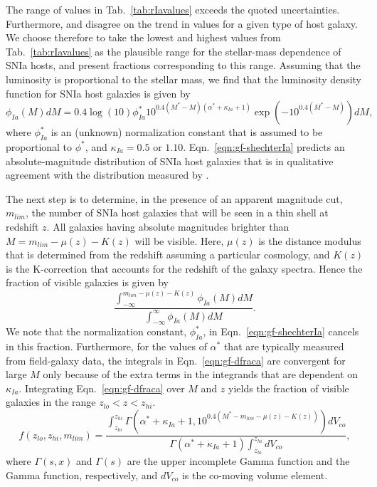 \documentclass[preprint2]{aastex}    %
\begin{document}
The range of values in Tab.~\ref{tab:rIavalues} exceeds the quoted uncertainties. 
Furthermore, \cite{smi11} and \cite{sul06} disagree on the trend in values for a given type of host galaxy.
We choose therefore to take the lowest and highest values from Tab.~\ref{tab:rIavalues} 
as the plausible range for the stellar-mass dependence of SNIa
hosts, and present fractions corresponding to this range.
Assuming that the luminosity is proportional to the stellar mass, we find that
the luminosity density function for SNIa host galaxies is given by
\begin{equation}
  \phi_{Ia}(M)dM=0.4\log(10)\phi_{Ia}^{*}10^{0.4(M^{*}-M)(\alpha^{*}+\kappa_{Ia}+1)}\exp({-10^{0.4(M^{*}-M)}})dM,
\label{eqn:gf-shechterIa}
\end{equation}
where $\phi_{Ia}^{*}$ is an (unknown) normalization constant that is assumed to be proportional to
$\phi^{*}$, and $\kappa_{Ia}=0.5$ or $1.10$. 
Eqn.~\ref{eqn:gf-shechterIa} predicts an absolute-magnitude distribution of SNIa host galaxies
that is in qualitative agreement with the distribution measured by \cite{yas10}.

The next step is to determine, in the presence of an apparent magnitude cut, $m_{lim}$,
the number of SNIa host galaxies that will be seen in a thin shell at redshift $z$.
All galaxies having absolute magnitudes brighter than $M = m_{lim}-\mu(z)-K(z)$ will be visible.
Here, $\mu(z)$ is the distance modulus that is determined from the redshift assuming a particular cosmology, 
and $K(z)$ is the K-correction that accounts for the redshift of the galaxy spectra. 
Hence the fraction of visible galaxies is given by
\begin{equation}
 \frac{ \int^{m_{lim}-\mu(z)-K(z)}_{-\infty} \phi_{Ia}(M)dM} {\int^\infty_{-\infty}\phi_{Ia}(M)dM}.
\label{eqn:gf-dfraca}
\end{equation}
We note that the normalization constant, $\phi_{Ia}^{*}$, in Eqn.~\ref{eqn:gf-shechterIa} cancels in this fraction.
Furthermore, for the values of $\alpha^{*}$ that are 
typically measured from field-galaxy data, the integrals in Eqn.~\ref{eqn:gf-dfraca} are convergent for large $M$ only 
because of the extra terms in the integrands that are dependent on $\kappa_{Ia}$. 
Integrating Eqn.~\ref{eqn:gf-dfraca} over $M$ and $z$ yields the fraction of visible galaxies in the range $z_{lo}<z<z_{hi}$. 
\begin{equation}
   f(z_{lo},z_{hi},m_{lim})= \frac{ \int_{z_{lo}}^{z_{hi}} \Gamma(\alpha^{*}+\kappa_{Ia}+1, 10^{0.4(M^{*}- m_{lim}-\mu(z)-K(z))})dV_{co}} {\Gamma(\alpha^{*}+\kappa_{Ia}+1) \int_{z_{lo}}^{z_{hi}} dV_{co}},
\label{eqn:gf-dfracb}
\end{equation}
where $\Gamma(s,x)$ and $\Gamma(s)$ are the upper incomplete Gamma function and the Gamma function, respectively,
and $ dV_{co}$ is the co-moving volume element. 
\end{document}
